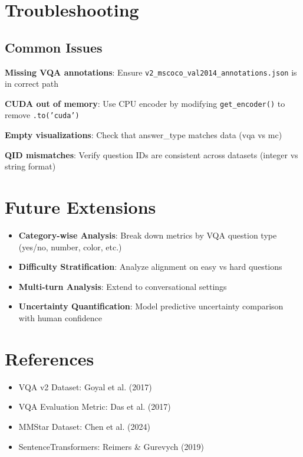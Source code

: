 \documentclass{article}
\begin{document}
\section{Troubleshooting}

\subsection{Common Issues}

\textbf{Missing VQA annotations}: Ensure \texttt{v2\_mscoco\_val2014\_annotations.json} is in correct path

\textbf{CUDA out of memory}: Use CPU encoder by modifying \texttt{get\_encoder()} to remove \texttt{.to('cuda')}

\textbf{Empty visualizations}: Check that answer\_type matches data (vqa vs mc)

\textbf{QID mismatches}: Verify question IDs are consistent across datasets (integer vs string format)

\section{Future Extensions}

\begin{itemize}
    \item \textbf{Category-wise Analysis}: Break down metrics by VQA question type (yes/no, number, color, etc.)
    \item \textbf{Difficulty Stratification}: Analyze alignment on easy vs hard questions
    \item \textbf{Multi-turn Analysis}: Extend to conversational settings
    \item \textbf{Uncertainty Quantification}: Model predictive uncertainty comparison with human confidence
\end{itemize}

\section{References}

\begin{itemize}
    \item VQA v2 Dataset: Goyal et al. (2017)
    \item VQA Evaluation Metric: Das et al. (2017)
    \item MMStar Dataset: Chen et al. (2024)
    \item SentenceTransformers: Reimers \& Gurevych (2019)
\end{itemize}
\end{document}
